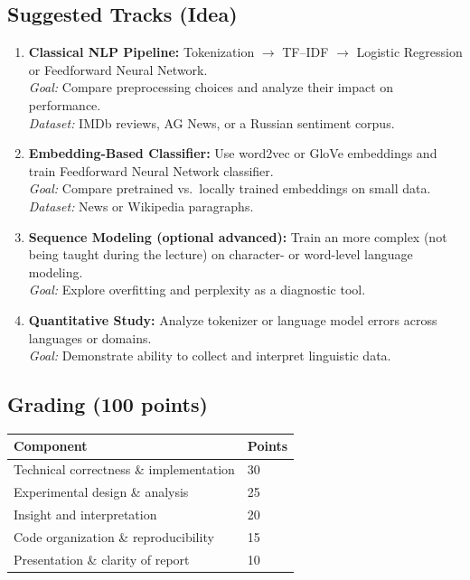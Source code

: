 \documentclass[12pt]{article}
\begin{document}
\subsection*{Suggested Tracks (Idea)}
\begin{enumerate}[leftmargin=*]
  \item \textbf{Classical NLP Pipeline:} Tokenization $\rightarrow$ TF--IDF $\rightarrow$ Logistic Regression or Feedforward Neural Network.\\
        \emph{Goal:} Compare preprocessing choices and analyze their impact on performance.\\
        \emph{Dataset:} IMDb reviews, AG News, or a Russian sentiment corpus.

  \item \textbf{Embedding-Based Classifier:} Use word2vec or GloVe embeddings and train Feedforward Neural Network classifier.\\
        \emph{Goal:} Compare pretrained vs.\ locally trained embeddings on small data.\\
        \emph{Dataset:} News or Wikipedia paragraphs.

  \item \textbf{Sequence Modeling (optional advanced):} Train an more complex (not being taught during the lecture)  on character- or word-level language modeling.\\
        \emph{Goal:} Explore overfitting and perplexity as a diagnostic tool.

  \item \textbf{Quantitative Study:} Analyze tokenizer or language model errors across languages or domains.\\
        \emph{Goal:} Demonstrate ability to collect and interpret linguistic data.
\end{enumerate}

\subsection*{Grading (100 points)}
\begin{tabular}{ll}
\textbf{Component} & \textbf{Points} \\
\hline
Technical correctness \& implementation & 30 \\
Experimental design \& analysis & 25 \\
Insight and interpretation & 20 \\
Code organization \& reproducibility & 15 \\
Presentation \& clarity of report & 10 \\
\end{tabular}
\end{document}
